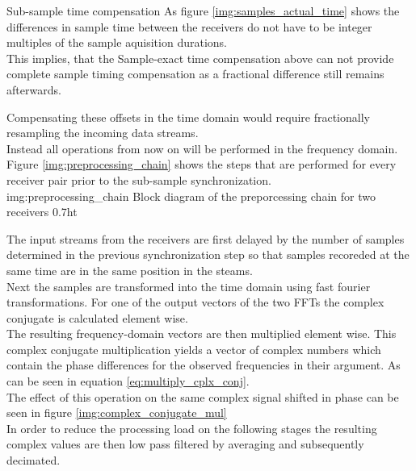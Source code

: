 \begin{subchapter}{Sub-sample time compensation}
  As figure \ref{img:samples_actual_time} shows the
  differences in sample time between the receivers do not
  have to be integer multiples of the sample aquisition durations. \\

  This implies, that the Sample-exact time compensation above
  can not provide complete sample timing compensation as
  a fractional difference still remains afterwards.

  Compensating these offsets in the time domain would
  require fractionally resampling the incoming data streams. \\

  Instead all operations from now on will be performed
  in the frequency domain. Figure \ref{img:preprocessing_chain}
  shows the steps that are performed for every receiver pair prior to
  the sub-sample synchronization. \\

               {img:preprocessing_chain}
               {Block diagram of the preporcessing chain for two receivers}
               {0.7}{ht}

  The input streams from the receivers are first delayed
  by the number of samples determined in the previous
  synchronization step so that samples recoreded at the
  same time are in the same position in the steams. \\

  Next the samples are transformed into the time domain
  using fast fourier transformations.
  For one of the output vectors of the two FFTs the
  complex conjugate is calculated element wise. \\

  The resulting frequency-domain vectors are then
  multiplied element wise. This complex conjugate multiplication
  yields a vector of complex numbers which contain the
  phase differences for the observed frequencies in
  their argument. As can be seen in equation
  \ref{eq:multiply_cplx_conj}. \\

  The effect of this operation on the same complex signal
  shifted in phase can be seen in figure \ref{img:complex_conjugate_mul} \\

  In order to reduce the processing load on the following stages
  the resulting complex values are then low pass filtered by
  averaging and subsequently decimated.


\end{subchapter}
